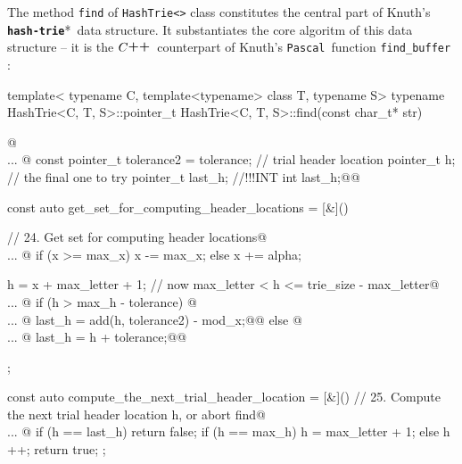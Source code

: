 \documentclass[a4paper,11pt]{article}
\makeatletter
\renewcommand{\=}{\protect\nobreakdash-\hspace{0pt}}
\renewcommand{\~}{\protect\nobreakdash--\hspace{0pt}}
\newcommand{\plusplus}{\textbf{\raisebox{1pt}{++}}}
\newcommand{\cplusplus}{$C\plusplus$}
\newcommand{\pascal}{\code{Pascal}}
\newcommand{\hashtrie}{{\tt\textbf{hash-trie}}}
\newcommand\hashtrie*{\emph{hash\=trie}}
\newcommand{\code}[1]{{\tt{#1}}}
\newcommand\code*[1]{\mbox{\code{#1}}}
\newcommand{\pp}[2]{pp.~#1\~#2}
\newcommand{\paras}[2]{\mbox{\S\hspace{1pt}#1--#2}}
\newcommand{\paraspp}[4]{\paras{#1}{#2} on \pp{#3}{#4}}
\let\lst@ifskiplines\iffalse
\newcommand\skipnumbering[1]{%
	\setcounter{lstnumber}{\numexpr#1-1\relax}%
	\let\lst@ifskiplines\iftrue
	\\\lst@PlaceNumber
	\let\lst@ifskiplines\iffalse
	\lst@ifshowskiplines...\fi
}
\let\lst@PlaceNumber\@empty
\makeatother
\begin{document}
%
The method \code{find} of \code{HashTrie<>} class constitutes the central part
of Knuth's \hashtrie*\ data structure. It substantiates the core algoritm of this
data structure -- it is the \cplusplus\ counterpart of Knuth's \pascal\ function
\code{find\_buffer}
\cite[\paras{20}{21} and \paraspp{24}{31}{159}{162}]{knuth:literate}:
%
%
\begin{hashtrielisting}[2298]
template<
	typename C,
	template<typename> class T,
	typename S>
typename
	HashTrie<C, T, S>::pointer_t
	HashTrie<C, T, S>::find(const char_t* str)
{@\skipnumbering{2422}@
	const pointer_t tolerance2 = tolerance;
	// trial header location
	pointer_t h;
	// the final one to try
	pointer_t last_h; //!!!INT int last_h;@\label{cpp-last-h-def}@

	const auto get_set_for_computing_header_locations = [&]() {
		// 24. Get set for computing header locations@\skipnumbering{2454}@
		if (x >= max_x)
			x -= max_x;
		else
			x += alpha;

		h = x + max_letter + 1; // now max_letter < h <= trie_size - max_letter@\skipnumbering{2483}@
		if (h > max_h - tolerance) {@\skipnumbering{2500}@
			last_h = add(h, tolerance2) - mod_x;@\label{cpp-last-h-assign-1}@
		}
		else {@\skipnumbering{2510}@
			last_h = h + tolerance;@\label{cpp-last-h-assign-2}@
		}
	};

	const auto compute_the_next_trial_header_location = [&]() {
		// 25. Compute the next trial header location h, or abort find@\skipnumbering{2522}@
		if (h == last_h)
			return false;
		if (h == max_h)
			h = max_letter + 1;
		else
			h ++;
		return true;
	};

}
\end{hashtrielisting}
\end{document}
